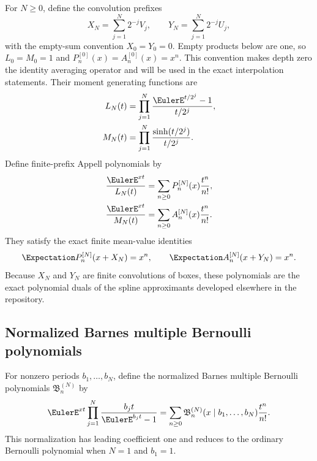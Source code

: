 For $N\ge0$, define the convolution prefixes
\begin{equation}
 X_N=\sum_{j=1}^{N}2^{-j}V_j,
 \qquad
 Y_N=\sum_{j=1}^{N}2^{-j}U_j,
 \label{is:p2:eq:finite-XY}
\end{equation}
with the empty-sum convention $X_0=Y_0=0$.  Empty products below are one,
so $L_0=M_0=1$ and $P_n^{[0]}(x)=A_n^{[0]}(x)=x^n$.  This convention makes
depth zero the identity averaging operator and will be used in the exact
interpolation statements.  Their moment generating functions are
\begin{align}
 L_N(t)&=\prod_{j=1}^{N}\frac{\EulerE^{t/2^j}-1}{t/2^j},
 \label{is:p2:eq:LN}\\
 M_N(t)&=\prod_{j=1}^{N}\frac{\sinh(t/2^j)}{t/2^j}.
 \label{is:p2:eq:MN}
\end{align}
Define finite-prefix Appell polynomials by
\begin{align}
 \frac{\EulerE^{xt}}{L_N(t)}
 &=\sum_{n\ge0}P_n^{[N]}(x)\frac{t^n}{n!},
 \label{is:p2:eq:PN-generating}\\
 \frac{\EulerE^{xt}}{M_N(t)}
 &=\sum_{n\ge0}A_n^{[N]}(x)\frac{t^n}{n!}.
 \label{is:p2:eq:AN-generating}
\end{align}
They satisfy the exact finite mean-value identities
\begin{equation}
 \Expectation P_n^{[N]}(x+X_N)=x^n,
 \qquad
 \Expectation A_n^{[N]}(x+Y_N)=x^n.
 \label{is:p2:eq:finite-mean-value}
\end{equation}
Because $X_N$ and $Y_N$ are finite convolutions of boxes, these polynomials are the exact
polynomial duals of the spline approximants developed elsewhere in the repository.

\subsection{Normalized Barnes multiple Bernoulli polynomials}

For nonzero periods $b_1,\ldots,b_N$, define the normalized Barnes multiple Bernoulli polynomials
$\mathfrak B_n^{(N)}$ by
\begin{equation}
 \EulerE^{xt}\prod_{j=1}^{N}\frac{b_jt}{\EulerE^{b_jt}-1}
 =\sum_{n\ge0}
 \mathfrak B_n^{(N)}(x\mid b_1,\ldots,b_N)\frac{t^n}{n!}.
 \label{is:p2:eq:Barnes-def}
\end{equation}
This normalization has leading coefficient one and reduces to the ordinary Bernoulli polynomial
when $N=1$ and $b_1=1$.

